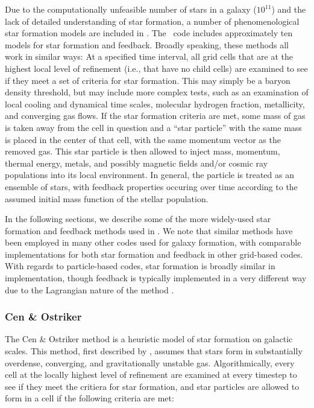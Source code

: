 Due to the computationally unfeasible number of stars in a galaxy
($10^{11}$) and the lack of detailed understanding of star formation, a
number of phenomenological star formation models are included in
\enzo.
The \enzo\ code includes approximately ten models for star formation
and feedback.  Broadly speaking, these methods all work in similar
ways: At a specified time interval, all grid cells that are at the
highest local level of refinement (i.e., that have no child cells) are
examined to see if they meet a set of criteria for star formation.
This may simply be a baryon density threshold, but may include more
complex tests, such as an examination of local cooling and dynamical
time scales, molecular hydrogen fraction, metallicity, and converging
gas flows.  If the star formation criteria are met, some mass of gas
is taken away from the cell in question and a ``star particle'' with
the same mass is placed in the center of that cell, with the same
momentum vector as the removed gas.  This star particle is then
allowed to inject mass, momentum, thermal energy, metals, and possibly
magnetic fields and/or cosmic ray populations into its local
environment.  In general, the particle is treated as an ensemble of
stars, with feedback properties occuring over time according to the
assumed initial mass function of the stellar population.

In the following sections, we describe some of the more widely-used
star formation and feedback methods used in \enzo.  We note that
similar methods have been employed in many other codes used for galaxy
formation, with comparable implementations for both star formation and
feedback in other grid-based codes.  With regards to particle-based
codes, star formation is broadly similar in implementation, though
feedback is typically implemented in a very different way due to the
Lagrangian nature of the method \citep[see,
e.g.,][]{sh03a,sh03b,hs03}.

\subsubsection{Cen \& Ostriker}
\label{sec:starform_cen}

The Cen \& Ostriker method is a heuristic model of star formation on
galactic scales.  This method, first described by \citet{CO1992},
assumes that stars form in substantially overdense, converging, and
gravitationally unstable gas.  Algorithmically, every cell at the
locally highest level of refinement are examined at every timestep to
see if they meet the critiera for star formation, and star particles
are allowed to form in a cell if the following criteria are met:

